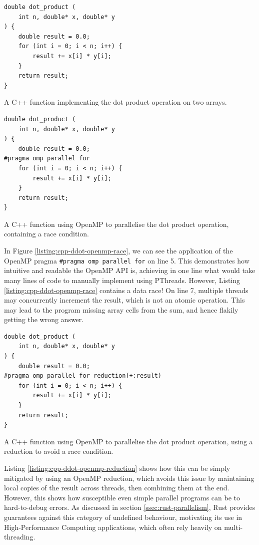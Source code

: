 \begin{listing}[H]
    \begin{verbatim}
double dot_product (
    int n, double* x, double* y
) {
    double result = 0.0;
    for (int i = 0; i < n; i++) {
        result += x[i] * y[i];
    }
    return result;
}
    \end{verbatim}
    \caption{A C++ function implementing the dot product operation on two arrays.}
    \label{listing:cpp-ddot}
\end{listing}

\begin{listing}[H]
    \begin{verbatim}
double dot_product (
    int n, double* x, double* y
) {
    double result = 0.0;
#pragma omp parallel for
    for (int i = 0; i < n; i++) {
        result += x[i] * y[i];
    }
    return result;
}
    \end{verbatim}
    \caption{A C++ function using OpenMP to parallelise the dot product operation, containing a race condition.}
    \label{listing:cpp-ddot-openmp-race}
\end{listing}

In Figure \ref{listing:cpp-ddot-openmp-race}, we can see the application of the OpenMP pragma \texttt{#pragma omp parallel for} on line 5. This demonstrates how intuitive and readable the OpenMP API is, achieving in one line what would take many lines of code to manually implement using PThreads. However, Listing \ref{listing:cpp-ddot-openmp-race} contains a data race! On line 7, multiple threads may concurrently increment the result, which is not an atomic operation. This may lead to the program missing array cells from the sum, and hence flakily getting the wrong answer.

\begin{listing}[H]
    \begin{verbatim}
double dot_product (
    int n, double* x, double* y
) {
    double result = 0.0;
#pragma omp parallel for reduction(+:result)
    for (int i = 0; i < n; i++) {
        result += x[i] * y[i];
    }
    return result;
}
    \end{verbatim}
    \caption{A C++ function using OpenMP to parallelise the dot product operation, using a reduction to avoid a race condition.}
    \label{listing:cpp-ddot-openmp-reduction}
\end{listing}

Listing \ref{listing:cpp-ddot-openmp-reduction} shows how this can be simply mitigated by using an OpenMP reduction, which avoids this issue by maintaining local copies of the result across threads, then combining them at the end. However, this shows how susceptible even simple parallel programs can be to hard-to-debug errors. As discussed in section \ref{ssec:rust-parallelism}, Rust provides guarantees against this category of undefined behaviour, motivating its use in High-Performance Computing applications, which often rely heavily on multi-threading.

